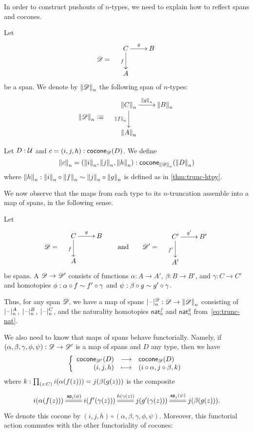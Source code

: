 In order to construct pushouts of $n$-types, we need to explain how to reflect spans and cocones.

\bgroup
\def\reflect(#1){\trunc n{#1}}

\begin{defn}
  Let
  \[\Ddiag=\quad\vcenter{\xymatrix{C \ar^g[r] \ar_f[d] & B \\ A & }}\]
  be a span. We denote by $\reflect(\Ddiag)$ the following
  span of $n$-types:
  \[\reflect(\Ddiag)\defeq\quad \vcenter{\xymatrix{\reflect(C) \ar^{\reflect(g)}[r]
      \ar_{\reflect(f)}[d] & \reflect(B) \\ \reflect(A) & }}\]
\end{defn}

\begin{defn}
  Let $D:\type$ and $c=(i,j,h):\cocone{\Ddiag}{D}$.
  We define
  \[\reflect(c)=(\reflect(i),\reflect(j),\reflect(h)):
  \cocone{\reflect(\Ddiag)}{\reflect(D)}\]
  where $\reflect(h): \reflect(i) \circ \reflect(f) \htpy \reflect(j) \circ \reflect(g)$ is defined as in \cref{thm:trunc-htpy}.
\end{defn}

\egroup

We now observe that the maps from each type to its $n$-truncation assemble into a map of spans, in the following sense.

\begin{defn}
  Let
  \[\Ddiag=\quad\vcenter{\xymatrix{C \ar^g[r] \ar_f[d] & B \\ A & }}
  \qquad\text{and}\qquad
  \Ddiag'=\quad\vcenter{\xymatrix{C' \ar^{g'}[r] \ar_{f'}[d] & B' \\ A' & }}
  \]
  be spans.
  A 
  $\Ddiag \to \Ddiag'$ consists of functions $\alpha:A\to A'$, $\beta:B\to B'$, and $\gamma:C\to C'$ and homotopies $\phi: \alpha\circ f \htpy f'\circ \gamma$ and $\psi:\beta\circ g \htpy g' \circ \gamma$.
\end{defn}

Thus, for any span $\Ddiag$, we have a map of spans $\tprojf[\Ddiag] n : \Ddiag \to \trunc n\Ddiag$ consisting of $\tprojf[A]n$, $\tprojf[B]n$, $\tprojf[C]n$, and the naturality homotopies $\mathsf{nat}^f_n$ and $\mathsf{nat}^g_n$ from~\eqref{eq:trunc-nat}.

We also need to know that maps of spans behave functorially.
Namely, if $(\alpha,\beta,\gamma,\phi,\psi):\Ddiag \to \Ddiag'$ is a map of spans and $D$ any type, then we have
\[ \function{\cocone{\Ddiag'}{D}}{\cocone{\Ddiag}{D}}{(i,j,h)}{(i\circ \alpha,j\circ\beta, k)} \]
where $k: \prd{z:C} i(\alpha(f(z))) = j(\beta(g(z)))$ is the composite
\begin{equation}\label{eq:mapofspans-htpy}
\xymatrix{
  i(\alpha(f(z))) \ar@{=}[r]^{\apfunc{i}(\phi)} &
  i(f'(\gamma(z))) \ar@{=}[r]^{h(\gamma(z))} &
  j(g'(\gamma(z))) \ar@{=}[r]^{\apfunc{j}(\psi)} &
  j(\beta(g(z))). }
\end{equation}
We denote this cocone by $(i,j,h) \circ (\alpha,\beta,\gamma,\phi,\psi)$.
Moreover, this functorial action commutes with the other functoriality of cocones:

